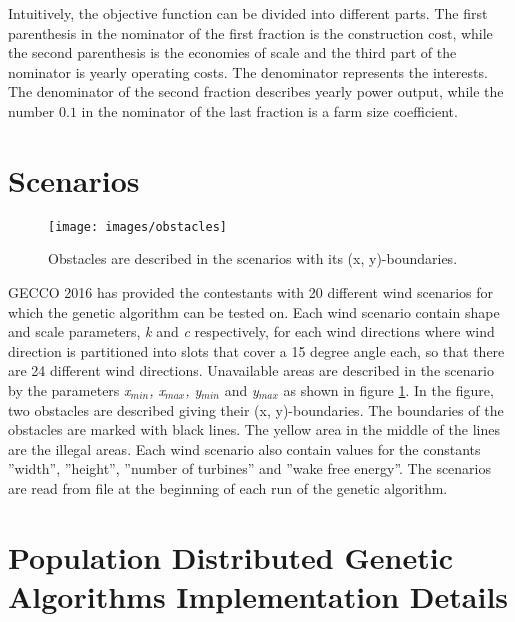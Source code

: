 \noindent Intuitively, the objective function can be divided into different parts. The first parenthesis in the nominator of the first fraction is the construction cost, while the second parenthesis is the economies of scale and the third part of the nominator is yearly operating costs. The denominator represents the interests. The denominator of the second fraction describes yearly power output, while the number $0.1$ in the nominator of the last fraction is a farm size coefficient. \\


\section{Scenarios}\label{section:scenarios}


\begin{figure}[h!]
\begin{center}
\texttt{[image: images/obstacles]}
\caption{Obstacles are described in the scenarios with its (x, y)-boundaries.}
\label{figure:obstacles}
\end{center}
\end{figure}


GECCO 2016 has provided the contestants with 20 different wind scenarios for which the genetic algorithm can be tested on. Each wind scenario contain shape and scale parameters, \textit{k} and \textit{c} respectively, for each wind directions where wind direction is partitioned into slots that cover a 15 degree angle each, so that there are 24 different wind directions. Unavailable areas are described in the scenario by the parameters \textit{x$_{min}$, x$_{max}$, y$_{min}$} and \textit{y$_{max}$} as shown in figure \ref{figure:obstacles}. In the figure, two obstacles are described giving their (x, y)-boundaries. The boundaries of the obstacles are marked with black lines. The yellow area in the middle of the lines are the illegal areas. Each wind scenario also contain values for the constants ''width'', ''height'', ''number of turbines'' and ''wake free energy''. The scenarios are read from file at the beginning of each run of the genetic algorithm. 

\section[PDGA's Implementation Details]{Population Distributed Genetic Algorithms Implementation Details}
\label{section:population distributed gas implementation details}


